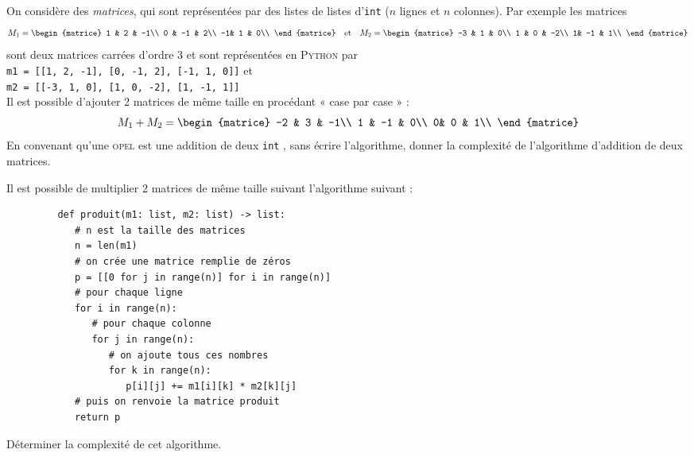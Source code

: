 \begin{exercice}
   On considère des \textit{matrices}, qui sont représentées par des listes de listes d'\texttt{int} ($n$ lignes et $n$ colonnes).
   Par exemple les matrices 
   \tabulardefault
   $$M_1 = \begin{matrice}
         1 & 2 & -1\\
         0 & -1 & 2\\
         -1& 1 & 0\\
   \end{matrice}\quad\text{et}\quad M_2 = \begin{matrice}
         -3 & 1 & 0\\
         1 & 0 & -2\\
         1& -1 & 1\\
   \end{matrice}$$
   sont deux matrices carrées d'ordre 3 et sont représentées en \textsc{Python} par \\
   \texttt{m1 = [[1, 2, -1], [0, -1, 2], [-1, 1, 0]]} et\\
   \texttt{m2 = [[-3, 1, 0], [1, 0, -2], [1, -1, 1]]}\\

   Il est possible d'ajouter 2 matrices de même taille en procédant « case par case »  :
   $$M_1+M_2 = \begin{matrice}
         -2 & 3 & -1\\
         1 & -1 & 0\\
         0& 0 & 1\\
   \end{matrice}$$
   En convenant qu'une \textsc{opel} est une addition de deux \texttt{int} , sans écrire l'algorithme, donner la complexité de l'algorithme d'addition de deux matrices.
\end{exercice}
\begin{exercice}
   Il est possible de multiplier 2 matrices de même taille suivant l'algorithme suivant :
  
      \begin{verbatim}
         def produit(m1: list, m2: list) -> list:
            # n est la taille des matrices
            n = len(m1) 
            # on crée une matrice remplie de zéros
            p = [[0 for j in range(n)] for i in range(n)]
            # pour chaque ligne
            for i in range(n):
               # pour chaque colonne
               for j in range(n):
                  # on ajoute tous ces nombres
                  for k in range(n):
                     p[i][j] += m1[i][k] * m2[k][j]
            # puis on renvoie la matrice produit
            return p
      \end{verbatim}


   Déterminer la complexité de cet algorithme.
\end{exercice}
